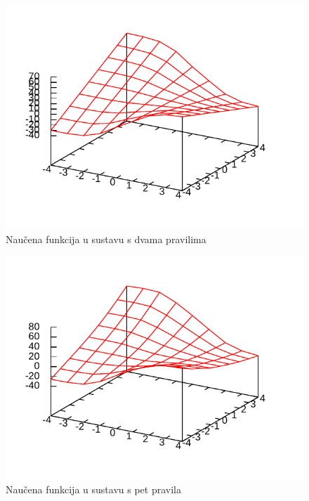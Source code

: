 \documentclass{article}
\begin{document}
\begin{figure}[h]
    \centering
    \includegraphics{img/prediction-batch-2.pdf}
    \caption{Naučena funkcija u sustavu s dvama pravilima}
    \label{pred-2}
\end{figure}

\begin{figure}[h]
    \centering
    \includegraphics{img/prediction-batch-5.pdf}
    \caption{Naučena funkcija u sustavu s pet pravila}
    \label{pred-5}
\end{figure}
\end{document}
